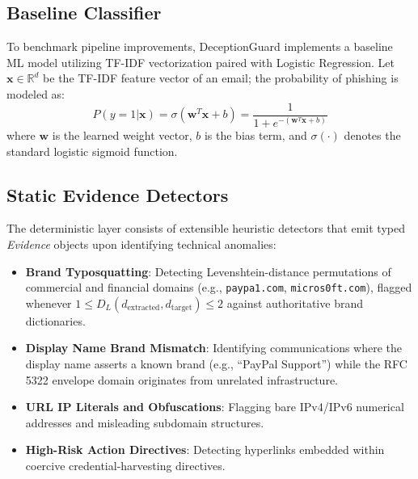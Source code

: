 \documentclass{ieeeaccess}
\begin{document}
\subsection{Baseline Classifier}
To benchmark pipeline improvements, DeceptionGuard implements a baseline ML model utilizing TF-IDF vectorization paired with Logistic Regression. Let $\mathbf{x} \in \mathbb{R}^d$ be the TF-IDF feature vector of an email; the probability of phishing is modeled as:
\begin{equation}
P(y=1|\mathbf{x}) = \sigma(\mathbf{w}^T \mathbf{x} + b) = \frac{1}{1 + e^{-(\mathbf{w}^T \mathbf{x} + b)}}
\label{eq:baseline}
\end{equation}
where $\mathbf{w}$ is the learned weight vector, $b$ is the bias term, and $\sigma(\cdot)$ denotes the standard logistic sigmoid function.

\subsection{Static Evidence Detectors}
The deterministic layer consists of extensible heuristic detectors that emit typed \textit{Evidence} objects upon identifying technical anomalies:
\begin{itemize}
    \item \textbf{Brand Typosquatting}: Detecting Levenshtein-distance permutations of commercial and financial domains (e.g., \texttt{paypa1.com}, \texttt{micros0ft.com}), flagged whenever $1 \le D_L(d_{\text{extracted}}, d_{\text{target}}) \le 2$ against authoritative brand dictionaries.
    \item \textbf{Display Name Brand Mismatch}: Identifying communications where the display name asserts a known brand (e.g., ``PayPal Support'') while the RFC 5322 envelope domain originates from unrelated infrastructure.
    \item \textbf{URL IP Literals and Obfuscations}: Flagging bare IPv4/IPv6 numerical addresses and misleading subdomain structures.
    \item \textbf{High-Risk Action Directives}: Detecting hyperlinks embedded within coercive credential-harvesting directives.
\end{itemize}
\end{document}
